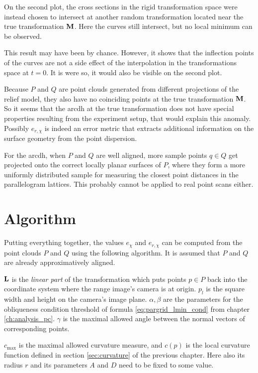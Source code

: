On the second plot, the cross sections in the rigid transformation space were instead chosen to intersect at another random transformation located near the true transformation $\mathbf{M}$. Here the curves still intersect, but no local minimum can be observed.

This result may have been by chance. However, it shows that the inflection points of the curves are not a side effect of the interpolation in the transformations space at $t = 0$. It is were so, it would also be visible on the second plot.

Because $P$ and $Q$ are point clouds generated from different projections of the relief model, they also have no coinciding points at the true transformation $\mathbf{M}$. So it seems that the \gls{arcdh} at the true transformation does not have special properties resulting from the experiment setup, that would explain this anomaly. Possibly $e_{r,\chi}$ is indeed an error metric that extracts additional information on the surface geometry from the point dispersion.

For the \gls{arcdh}, when $P$ and $Q$ are well aligned, more sample points $q \in Q$ get projected onto the correct locally planar surfaces of $P$, where they form a more uniformly distributed sample for measuring the closest point distances in the parallelogram lattices. This probably cannot be applied to real point scans either.


\section{Algorithm}
Putting everything together, the values $e_{\chi}$ and $e_{r,\chi}$ can be computed from the point clouds $P$ and $Q$ using the following algorithm. It is assumed that $P$ and $Q$ are already approximatively aligned.

$\mathbf{L}$ is the \emph{linear part} of the transformation which puts points $p \in P$ back into the coordinate system where the range image's camera is at origin. $p_l$ is the square width and height on the camera's image plane. $\alpha, \beta$ are the parameters for the obliqueness condition threshold of formula \ref{eq:pargrid_lmin_cond} from chapter \ref{ch:analysis_pc}. $\gamma$ is the maximal allowed angle between the normal vectors of corresponding points.

$c_{\text{max}}$ is the maximal allowed curvature measure, and $c(p)$ is the local curvature function defined in section \ref{sec:curvature} of the previous chapter. Here also its radius $r$ and its parameters $A$ and $D$ need to be fixed to some value.

